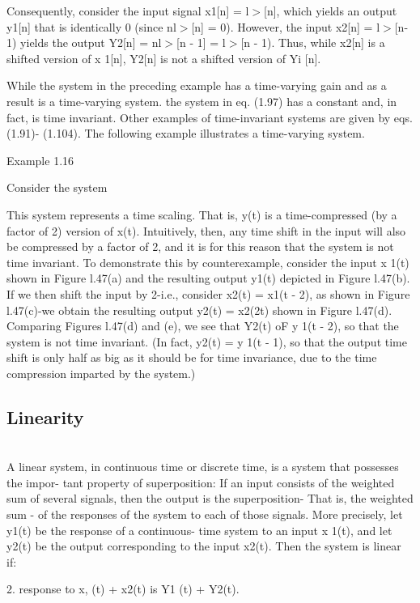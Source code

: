 \documentclass{report}
\begin{document}
Consequently, consider the input signal x1[n] = l$>$[n], which yields an output y1[n] that is identically 0 (since nl$>$[n] = 0). However, the input
x2[n] = l$>$[n-1) yields the output Y2[n] = nl$>$[n - 1] = l$>$[n - 1). Thus, while x2[n] is a shifted version of x 1[n], Y2[n] is not a shifted
version of Yi [n].

While the system in the preceding example has a time-varying gain and as a result is a time-varying system. the system in eq. (1.97) has a constant
{ } { } and, in fact, is time invariant. Other examples of time-invariant systems are given by eqs. (1.91)- (1.104). The following example illustrates
a time-varying system.

Example 1.16

Consider the system



This system represents a time scaling. That is, y(t) is a time-compressed (by a factor of 2) version of x(t). Intuitively, then, any time shift in
the input will also be compressed by a factor of 2, and it is for this reason that the system is not time invariant. To demonstrate this by counterexample,
consider the input x 1(t) shown in Figure l.47(a) and the resulting output y1(t) depicted in Figure l.47(b). If we then shift the input by 2-i.e.,
consider x2(t) = x1(t - 2), as shown in Figure l.47(c)-we obtain the resulting output y2(t) = x2(2t) shown in Figure l.47(d). Comparing Figures l.47(d)
and (e), we see that Y2(t) oF y 1(t - 2), so that the system is not time invariant. (In fact, y2(t) = y 1(t - 1), so that the output time shift is
only half as big as it should be for time invariance, due to the time compression imparted by the system.)

\subsection*{Linearity}

\\
A linear system, in continuous time or discrete time, is a system that possesses the impor- tant property of superposition: If an input consists
of the weighted sum of several signals, then the output is the superposition- That is, the weighted sum - of the responses of the system to each
of those signals. More precisely, let y1(t) be the response of a continuous- time system to an input x 1(t), and let y2(t) be the output corresponding
to the input x2(t). Then the system is linear if:

2. { } { } response to x, (t) + x2(t) is Y1 (t) + Y2(t).
\end{document}
